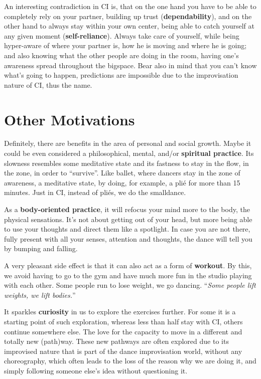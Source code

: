 An interesting contradiction in CI is, that on the one hand you have to be able to completely rely on your partner, building up trust (\textbf{dependability}), and on the other hand to always stay within your own center, being able to catch yourself at any given moment (\textbf{self-reliance}).
Always take care of yourself, while being hyper-aware of where your partner is, how he is moving and where he is going;
and also knowing what the other people are doing in the room, having one's awareness spread throughout the \gls{bigspace}.
Bear also in mind that you can't know what's going to happen, predictions are impossible due to the improvisation nature of CI, thus the name.

\section{Other Motivations}\label{sec:other-motivations}

Definitely, there are benefits in the area of personal and social growth.
Maybe it could be even considered a philosophical, mental, and/or \textbf{spiritual practice}.
Its slowness resembles some meditative state and its fastness to stay in the flow, in the zone, in order to ``survive''.
Like ballet, where dancers stay in the zone of awareness, a meditative state, by doing, for example, a plié for more than 15 minutes.
Just in CI, instead of pliés, we do the \gls{smalldance}.

As a \textbf{body-oriented practice}, it will refocus your mind more to the body, the physical sensations.
It's not about getting out of your head, but more being able to use your thoughts and direct them like a spotlight.
In case you are not there, fully present with all your senses, attention and thoughts, the dance will tell you by bumping and falling.

A very pleasant side effect is that it can also act as a form of \textbf{workout}.
By this, we avoid having to go to the gym and have much more fun in the studio playing with each other.
Some people run to lose weight, we go dancing.
``\textit{Some people lift weights, we lift bodies.}''

It sparkles \textbf{curiosity} in us to explore the exercises further.
For some it is a starting point of such exploration, whereas less than half stay with CI, others continue somewhere else.
The love for the capacity to move in a different and totally new (path)way.
These new pathways are often explored due to its improvised nature that is part of the dance improvisation world, without any choreography, which often leads to the loss of the reason why we are doing it, and simply following someone else's idea without questioning it.


